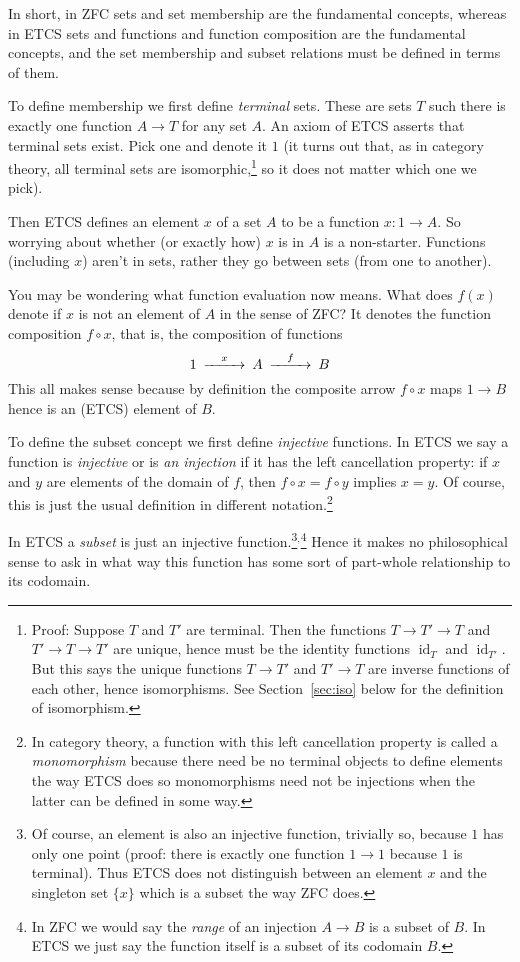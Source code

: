 \documentclass[11pt]{article}
\DeclareMathOperator{\idfun}{id}
\begin{document}
In short, in ZFC sets and set membership are the fundamental concepts,
whereas in ETCS sets and
functions and function composition are the fundamental concepts, and the
set membership and subset relations must be defined in terms of them.

To define membership \citep[Section~1]{leinster}
we first define \emph{terminal} sets.
These are sets $T$ such there is exactly one function $A \to T$ for any
set $A$.  An axiom of ETCS asserts that terminal sets exist.
Pick one and denote it $1$ (it turns out that, as in category theory,
all terminal sets are isomorphic,\footnote{Proof: Suppose $T$ and $T'$ are
terminal.  Then the functions $T \to T' \to T$ and $T' \to T \to T'$ are
unique, hence must be the identity functions $\idfun_T$ and $\idfun_{T'}$.
But this says the unique functions $T \to T'$ and $T' \to T$ are
inverse functions of each other, hence isomorphisms.
\label{foot:terminal}
See Section~\ref{sec:iso} below for the definition of isomorphism.}
so it does not matter which one we pick).

Then ETCS defines an element $x$ of a set $A$ to be a function $x : 1 \to A$.
So worrying about whether (or exactly how) $x$ is in $A$ is a non-starter.
Functions (including $x$) aren't in sets, rather they go between sets
(from one to another).

You may be wondering what function evaluation now means.  What does $f(x)$
denote if $x$ is not an element of $A$ in the sense of ZFC?  It denotes
the function composition $f \circ x$, that is, the composition of functions
$$
\begin{CD}
   1 @>x>> A @>f>> B
\end{CD}
$$
This all makes sense because by definition the composite arrow $f \circ x$
maps $1 \to B$ hence is an (ETCS) element of $B$.

To define the subset concept \citep[Discussion of Axiom~8]{leinster}
we first define \emph{injective} functions.
In ETCS we say a function is \emph{injective} or is \emph{an injection} if
it has the left cancellation property: if $x$ and $y$ are elements of
the domain of $f$, then $f \circ x = f \circ y$ implies $x = y$.
Of course, this is just the usual definition in different
notation.\footnote{In category theory, a function with this left cancellation
property is called a \emph{monomorphism} because there need be no terminal
objects to define elements the way ETCS does so monomorphisms need not be
injections when the latter can be defined in some way.}

In ETCS a \emph{subset} is just an injective function.\footnote{
Of course, an element is also an injective function, trivially so, because
$1$ has only one point (proof: there is exactly one function $1 \to 1$
because $1$
is terminal).  Thus ETCS does not distinguish between an element $x$ and
the singleton set $\{x\}$ which is a subset
the way ZFC does.}$^,$\footnote{In ZFC we would
say the \emph{range} of an injection $A \to B$ is a subset of $B$.
In ETCS we just say the function itself is a subset of its codomain $B$.}
Hence it makes no philosophical sense to ask in what way this function
has some sort of part-whole relationship to its codomain.
\end{document}
